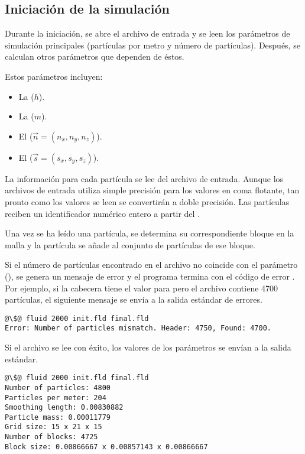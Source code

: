 \subsection{Iniciación de la simulación}

Durante la iniciación, se abre el archivo de entrada y se leen los parámetros de
simulación principales (partículas por metro y número de partículas).
Después, se calculan otros parámetros que dependen de éstos.

Estos parámetros incluyen:
\begin{itemize}
\item La  ($h$).
\item La  ($m$).
\item El  ($\vec{n} = (n_x, n_y, n_z)$).
\item El  ($\vec{s} = (s_x, s_y, s_z)$).
\end{itemize}

La información para cada partícula se lee del archivo de entrada. Aunque los
archivos de entrada utiliza simple precisión para los valores en coma flotante,
tan pronto como los valores se leen se convertirán a doble precisión. Las
partículas reciben un identificador numérico entero a partir del .

Una vez se ha leído una partícula, se determina su correspondiente bloque en la
malla y la partícula se añade al conjunto de partículas de ese bloque.

Si el número de partículas encontrado en el archivo no coincide con el parámetro
 (), se genera un mensaje de error y
el programa termina con el código de error
. Por ejemplo, si la cabecera tiene el valor  para
 pero el archivo contiene 4700 partículas, el siguiente mensaje se
envía a la salida estándar de errores.

\begin{lstlisting}[style=terminal,escapechar=@]
@\$@ fluid 2000 init.fld final.fld
Error: Number of particles mismatch. Header: 4750, Found: 4700.
\end{lstlisting}

Si el archivo se lee con éxito, los valores de los parámetros se envían a la
salida estándar.

\begin{lstlisting}[style=terminal,escapechar=@]
@\$@ fluid 2000 init.fld final.fld
Number of particles: 4800
Particles per meter: 204
Smoothing length: 0.00830882
Particle mass: 0.00011779
Grid size: 15 x 21 x 15
Number of blocks: 4725
Block size: 0.00866667 x 0.00857143 x 0.00866667
\end{lstlisting}

